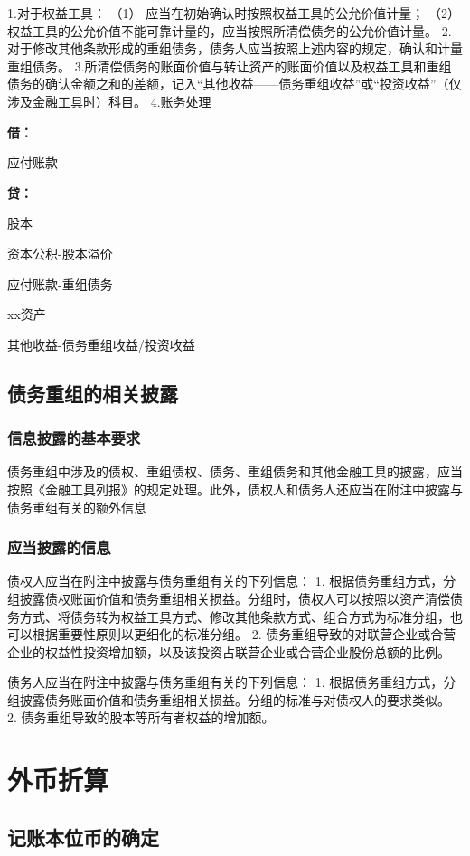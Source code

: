 \documentclass[UTF8,12pt]{ctexart}
\newenvironment{Dr}{%
	\begin{list}{}%
		{
			\setlength{\leftmargin}{2em}
			\setlength{\labelwidth}{2em}
			\setlength{\labelsep}{0pt}
			\setlength{\itemindent}{0pt}
			\setlength{\listparindent}{0pt}
			\setlength{\parsep}{0pt}
			\setlength{\topsep}{0pt}
		}
		\item[\textbf{借：}]
	}{%
	\end{list}
}
\newenvironment{Cr}{%
	\begin{list}{}%
		{
			\setlength{\leftmargin}{2em}
			\setlength{\labelwidth}{2em}
			\setlength{\labelsep}{0pt}
			\setlength{\itemindent}{0pt}
			\setlength{\listparindent}{0pt}
			\setlength{\parsep}{0pt}
			\setlength{\topsep}{0pt}
		}
		\item[\textbf{贷：}]
	}{%
	\end{list}
}
\numberwithin{equation}{section} %
\numberwithin{figure}{section}
\numberwithin{table}{section}
\begin{document}
	1.对于权益工具：
	（1）	应当在初始确认时按照权益工具的公允价值计量；
	（2）	权益工具的公允价值不能可靠计量的，应当按照所清偿债务的公允价值计量。  2.对于修改其他条款形成的重组债务，债务人应当按照上述内容的规定，确认和计量重组债务。
	3.所清偿债务的账面价值与转让资产的账面价值以及权益工具和重组债务的确认金额之和的差额，记入“其他收益——债务重组收益”或“投资收益”（仅涉及金融工具时）科目。
	4.账务处理
	\begin{Dr}
		应付账款
	\end{Dr}
	\begin{Cr}
		股本
		
		资本公积-股本溢价
		
		应付账款-重组债务
		
		xx资产
		
		其他收益-债务重组收益/投资收益
	\end{Cr}
	
	\subsection{债务重组的相关披露}
	\subsubsection{信息披露的基本要求}
	债务重组中涉及的债权、重组债权、债务、重组债务和其他金融工具的披露，应当按照《金融工具列报》的规定处理。此外，债权人和债务人还应当在附注中披露与债务重组有关的额外信息
	
	\subsubsection{应当披露的信息}
	债权人应当在附注中披露与债务重组有关的下列信息：
	1.	根据债务重组方式，分组披露债权账面价值和债务重组相关损益。分组时，债权人可以按照以资产清偿债务方式、将债务转为权益工具方式、修改其他条款方式、组合方式为标准分组，也可以根据重要性原则以更细化的标准分组。
	2.	债务重组导致的对联营企业或合营企业的权益性投资增加额，以及该投资占联营企业或合营企业股份总额的比例。
	
	债务人应当在附注中披露与债务重组有关的下列信息：
	1.	根据债务重组方式，分组披露债务账面价值和债务重组相关损益。分组的标准与对债权人的要求类似。
	2.	债务重组导致的股本等所有者权益的增加额。
	
	
	
	\newpage
	\section{外币折算}
	\subsection{记账本位币的确定}
\end{document}
